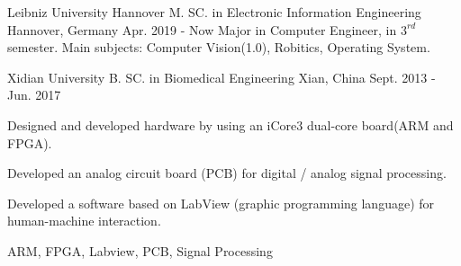 

\begin{cventries}

	\cventry
	{Leibniz University Hannover} %
	{M. SC. in Electronic Information Engineering} %
	{Hannover, Germany} %
	{Apr. 2019 - Now} %
	{Major in Computer Engineer, in $3^{rd}$ semester. Main subjects: Computer Vision(1.0), Robitics, Operating System.}
	{}

  \cventry
  	{Xidian University} %
    {B. SC. in Biomedical Engineering} %
    {Xian, China} %
    {Sept. 2013 - Jun. 2017} %
    {
      \begin{cvitems} %
        \item {Designed and developed hardware by using an iCore3 dual-core board(ARM and FPGA).}
        \item {Developed an analog circuit board (PCB) for digital / analog signal processing.}
        \item {Developed a software based on LabView (graphic programming language) for human-machine interaction.}
      \end{cvitems}
    }
	{ARM, FPGA, Labview, PCB, Signal Processing}

	\vspace{-2.0mm}

\end{cventries}

